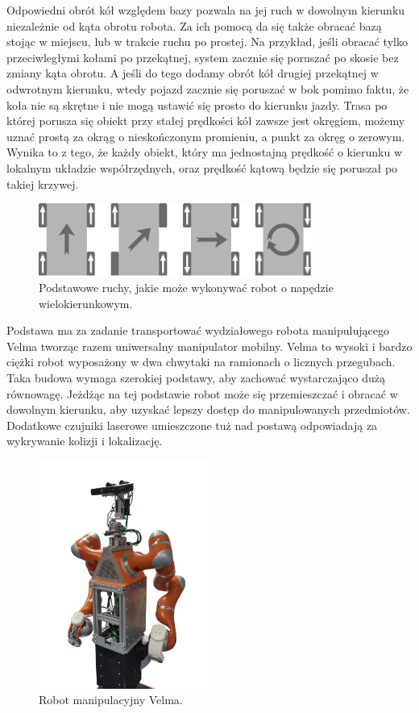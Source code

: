 Odpowiedni obrót kół względem bazy pozwala na jej ruch w dowolnym kierunku niezależnie od kąta obrotu robota.
Za ich pomocą da się także obracać bazą stojąc w miejscu, lub w trakcie ruchu po prostej.
Na przykład, jeśli obracać tylko przeciwległymi kołami po przekątnej, system zacznie się poruszać po skosie bez zmiany kąta obrotu.
A jeśli do tego dodamy obrót kół drugiej przekątnej w odwrotnym kierunku, wtedy pojazd zacznie się poruszać w bok pomimo faktu, że koła nie są skrętne i nie mogą ustawić się prosto do kierunku jazdy.
Trasa po której porusza się obiekt przy stałej prędkości kół zawsze jest okręgiem, możemy uznać prostą za okrąg o nieskończonym promieniu, a punkt za okręg o zerowym.
Wynika to z tego, że każdy obiekt, który ma jednostajną prędkość o kierunku w lokalnym układzie współrzędnych, oraz prędkość kątową będzie się poruszał po takiej krzywej.

\begin{figure}[H]
\centering
 \includegraphics[width=0.8\textwidth]{graphics/mecanum_dirs.pdf}
\caption{Podstawowe ruchy, jakie może wykonywać robot o napędzie wielokierunkowym.}
\end{figure} 

Podstawa ma za zadanie transportować wydziałowego robota manipulującego Velma tworząc razem uniwersalny manipulator mobilny.
Velma to wysoki i bardzo ciężki robot wyposażony w dwa chwytaki na ramionach o licznych przegubach.
Taka budowa wymaga szerokiej podstawy, aby zachować wystarczająco dużą równowagę.
Jeżdżąc na tej podstawie robot może się przemieszczać i obracać w dowolnym kierunku, aby uzyskać lepszy dostęp do manipulowanych przedmiotów.
Dodatkowe czujniki laserowe umieszczone tuż nad postawą odpowiadają za wykrywanie kolizji i lokalizację.

\begin{figure}[H]
\centering
 \includegraphics[width=0.5\textwidth]{graphics/velma.png}
\caption{Robot manipulacyjny Velma.}
\end{figure} 

